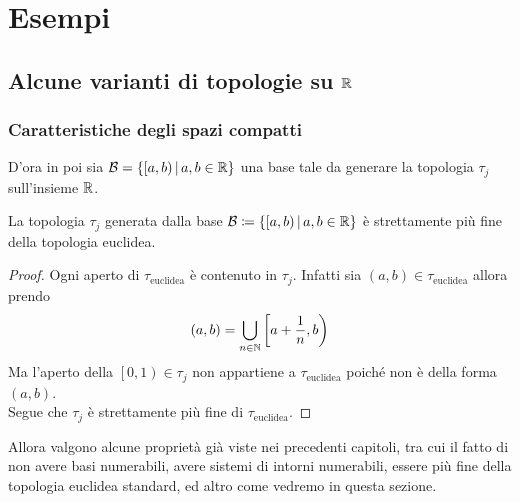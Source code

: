 \chapter{Esempi}



\section{Alcune varianti di topologie su $\mathbb{R}$}
\subsection{\textcolor{TopGener}{\textbf{Caratteristiche degli spazi compatti}}}



\begin{definition}
	D'ora in poi sia $\mathcal{B} = \left\{\left[a,b\right) \,\middle|\, a,b \in \mathbb{R}\right\}$ una base tale da generare la topologia $\tau_j$ sull'insieme $\mathbb{R}$.
\end{definition}

\begin{theorem}
	La topologia $\tau_j$ generata dalla base $\mathcal{B} \coloneqq \left\{ \left[a,b\right) \,\middle|\, a,b\in \mathbb{R} \right\}$ è strettamente più fine della topologia euclidea. 
\end{theorem}
\begin{proof}
	Ogni aperto di $\tau_{\text{euclidea}}$ è contenuto in $\tau_j$. Infatti sia $(a,b) \in \tau_{\text{euclidea}}$ allora prendo 
	\begin{equation*}
	(a,b) = \bigcup_{n \in \mathbb{N}} \left[a + \frac{1}{n}, b\right)
	\end{equation*}
	Ma l'aperto della $\left[0,1\right) \in \tau_j$ non appartiene a $\tau_{\text{euclidea}}$ poiché non è della forma $(a,b)$. \\ Segue che $\tau_j$ è strettamente più fine di $\tau_{\text{euclidea}}$.
\end{proof}

Allora valgono alcune proprietà già viste nei precedenti capitoli, tra cui il fatto di non avere basi numerabili, avere sistemi di intorni numerabili, essere più fine della topologia euclidea standard, ed altro come vedremo in questa sezione.

